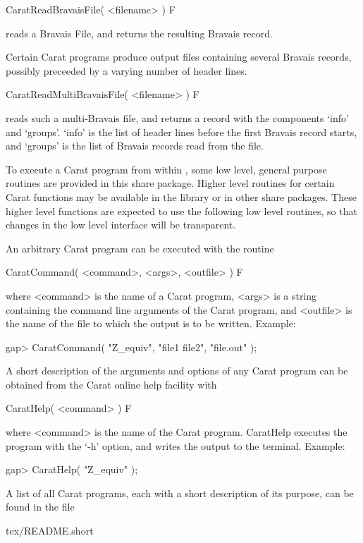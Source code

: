\>CaratReadBravaisFile( <filename> ) F

reads a Bravais File, and returns the resulting Bravais record.

Certain Carat programs produce output files containing several Bravais 
records, possibly preceeded by a varying number of header lines.

\>CaratReadMultiBravaisFile( <filename> ) F

reads such a multi-Bravais file, and returns a record with the components
`info' and `groups'. `info' is the list of header lines before the first
Bravais record starts, and `groups' is the list of Bravais records read from
the file.


To execute a Carat program from within {\GAP}, some low level,
general purpose routines are provided in this share package. 
Higher level routines for certain Carat functions may be available 
in the {\GAP} library or in other share packages. These higher
level functions are expected to use the following low level routines,
so that changes in the low level interface will be transparent. 

An arbitrary Carat program can be executed with the routine

\>CaratCommand( <command>, <args>, <outfile> ) F

where <command> is the name of a Carat program, <args> is a string
containing the command line arguments of the Carat program,
and <outfile> is the name of the file to which the output is to be 
written. Example:

\beginexample
    gap> CaratCommand( "Z_equiv", "file1 file2", "file.out" );
\endexample

A short description of the arguments and options of any Carat 
program can be obtained from the Carat online help facility with

\>CaratHelp( <command> ) F

where <command> is the name of the Carat program. CaratHelp executes
the program with the `-h' option, and writes the output to the 
terminal. Example:

\beginexample
    gap> CaratHelp( "Z_equiv" );
\endexample

A list of all Carat programs, each with a short description of its
purpose, can be found in the file 

\beginexample
    tex/README.short
\endexample

